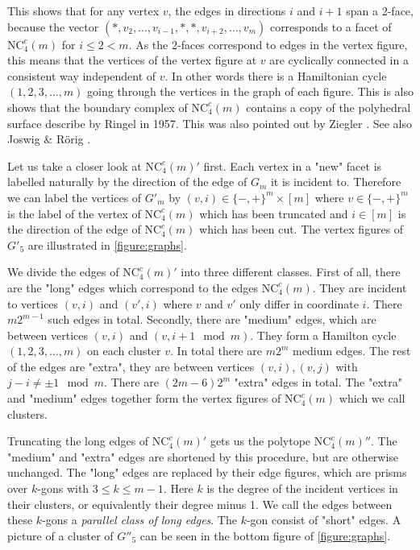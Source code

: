 \documentclass[a4paper,12pt]{book}
\theoremstyle{plain}
\theoremstyle{definition}
\newcommand\NCC{\mathrm{NC}^c}
\begin{document}
 This shows that for any vertex $v$, the edges in directions $i$ and $i+1$ span a 2-face, because
the vector $(*,v_2, \dots, v_{i-1}, *, *, v_{i+2}, \dots, v_m)$ corresponds to a facet of $\NCC_4(m)$
for $i\le 2 < m$. As the 2-faces correspond to edges in the vertex figure, this means that the vertices 
of the vertex figure at $v$ are cyclically connected in a consistent way independent of $v$. In other words
there is a Hamiltonian cycle $(1,2,3,\dots, m)$ going through the vertices in the graph of each figure.
This is also shows that the boundary complex of $\NCC_4(m)$ contains a copy of the polyhedral surface 
describe by Ringel \cite{ringel55:_ueber_probl_wuerf_wuerf} in 1957. This was also pointed out by
Ziegler \cite[Sect 3.]{Z100}. See also Joswig \& Rörig \cite{joswig:_neigh}.

Let us take a closer look at $\NCC_4(m)'$ first.  Each vertex in a "new" facet is labelled naturally by
the direction of the edge of $G_m$ it is incident to. Therefore we can label the vertices of $G'_m$
by $(v,i) \in \{-,+\}^m \times [m]$ where $v \in \{-,+\}^m$ is the label of the vertex of $\NCC_4(m)$ which has been truncated and $i \in [m]$ 
is the direction of the edge of $\NCC_4(m)$ which has been cut. The vertex figures of $G'_5$ are illustrated in \ref{figure:graphs}.

We divide the edges of $\NCC_4(m)'$ into three different classes. First of all, there are the "long" edges which correspond to the edges $\NCC_4(m)$.
They are incident to vertices $(v,i)$ and $(v',i)$ where $v$ and $v'$ only differ in coordinate $i$. There $m2^{m-1}$ such edges in total. Secondly, 
there are "medium" edges, which are between vertices $(v,i)$ and $(v,i+1\mod m)$. They form a Hamilton cycle $(1,2,3,\dots, m)$ on each cluster $v$. In total there are $m2^m$ medium edges. The rest of the edges are "extra", they are between vertices $(v,i), (v,j)$ with $j-i \neq \pm 1 \mod m$.
There are $(2m-6)2^m$ "extra" edges in total. The "extra" and "medium" edges together form the vertex figures of $\NCC_4(m)$ which we call clusters. 

Truncating the long edges of $\NCC_4(m)'$ gets us the polytope $\NCC_4(m)''$. The "medium" and "extra" edges are shortened by this procedure, but are otherwise unchanged. The "long" edges are replaced by their edge figures, which are prisms over $k$-gons with $3 \le k \le m-1$. Here $k$ is the degree of the incident vertices in their clusters, or equivalently their degree minus 1. We call the edges between these $k$-gons a \textit{parallel class of long edges}. The $k$-gon consist of "short" edges. A picture of a cluster of $G''_5$ can be seen in the bottom figure of \ref{figure:graphs}.
\end{document}
